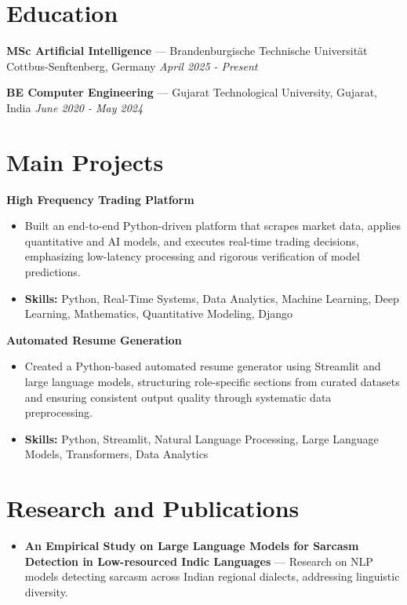 \documentclass[a4paper,10pt]{article}
\begin{document}
\section*{Education}
\textbf{MSc Artificial Intelligence} — Brandenburgische Technische Universität Cottbus-Senftenberg, Germany \hfill \textit{April 2025 - Present}\par
\vspace{1.5pt}
\textbf{BE Computer Engineering} — Gujarat Technological University, Gujarat, India \hfill \textit{June 2020 - May 2024}\par

\section*{Main Projects}
\textbf{High Frequency Trading Platform}\par
\vspace{1pt}
\begin{itemize}
  \item Built an end-to-end Python-driven platform that scrapes market data, applies quantitative and AI models, and executes real-time trading decisions, emphasizing low-latency processing and rigorous verification of model predictions.
  \item \textbf{Skills:} Python, Real-Time Systems, Data Analytics, Machine Learning, Deep Learning, Mathematics, Quantitative Modeling, Django
\end{itemize}
\vspace{3pt}
\textbf{Automated Resume Generation}\par
\vspace{1pt}
\begin{itemize}
  \item Created a Python-based automated resume generator using Streamlit and large language models, structuring role-specific sections from curated datasets and ensuring consistent output quality through systematic data preprocessing.
  \item \textbf{Skills:} Python, Streamlit, Natural Language Processing, Large Language Models, Transformers, Data Analytics
\end{itemize}

\section*{Research and Publications}
\begin{itemize}
\item \textbf{An Empirical Study on Large Language Models for Sarcasm Detection in Low-resourced Indic Languages} — Research on NLP models detecting sarcasm across Indian regional dialects, addressing linguistic diversity.
\end{itemize}
\end{document}
